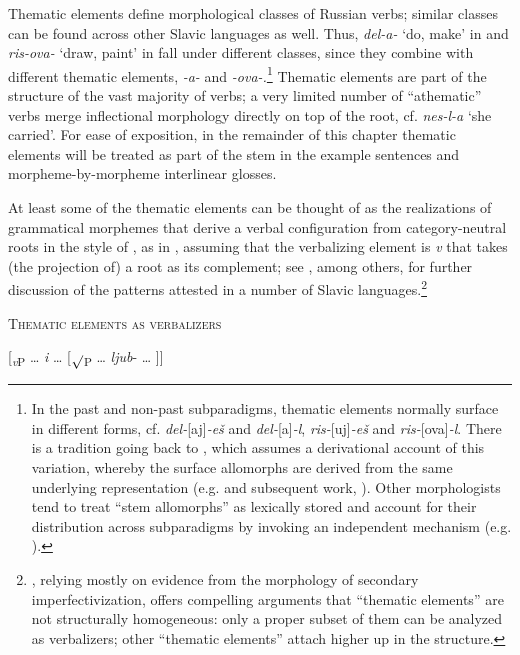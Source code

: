 \documentclass[output=paper,colorlinks,citecolor=brown]{langscibook}
\begin{document}
Thematic elements define morphological classes of Russian verbs; similar clas\-ses can be found across other Slavic languages as well. Thus, \textit{del-a-} ‘do, make’ in  and \textit{ris-ova-} ‘draw, paint’ in  fall under different classes, since they combine with different thematic elements, \textit{-a-} and \textit{-ova-.}\footnote{In the past and non-past subparadigms, thematic elements normally surface in different forms, cf. \textit{del-}[aj]\textit{-eš} and \textit{del-}[a]\textit{-l}, \textit{ris-}[uj]\textit{-eš} and \textit{ris-}[ova]\textit{-l}. There is a tradition going back to \citet{Jakobson1948}, which assumes a derivational account of this variation, whereby the surface allomorphs are derived from the same underlying representation (e.g. \citealt{Halle1963,Lightner1965} and subsequent work, \citealt{HalleMatushansky2004,Itkin2007}). Other morphologists tend to treat “stem allomorphs” as lexically stored and account for their distribution across subparadigms by invoking an independent mechanism (e.g. \citealt{Brown1998,Rubach.Booij2001}).} Thematic elements are part of the structure of the vast majority of verbs; a very limited number of “athematic” verbs merge inflectional morphology directly on top of the root, cf. \textit{nes-l-a} ‘she carried’. For %
ease of exposition, in the remainder of this chapter thematic elements will be treated as part of the stem in the example sentences and morpheme-by-morpheme interlinear glosses.

At least some of the thematic elements can be thought of as the realizations of grammatical morphemes that derive a verbal configuration from category-neutral roots in the style of \citet{Marantz1997}, as in , assuming that the verbalizing element is \textit{v} that takes (the projection of) a root as its complement; see \citet{Jablonska2007,Biskup2019,MismasSimonovic2021,Milosavljevic.Arsenijevic2022},  among others, for further discussion of the patterns attested in a number of Slavic languages.\footnote{\citet{Matushansky2009,Matushansky2021,Matushansky2024}, relying mostly on evidence from the morphology of secondary imperfectivization, offers compelling arguments that “thematic elements” are not structurally homogeneous: only a proper subset of them can be analyzed as verbalizers; other “thematic elements” attach higher up in the structure.}

\ea \textsc{Thematic elements as verbalizers}\label{tat:ex:3}

  [\textit{\textsubscript{v}}\textsubscript{P} … \textit{i} … [\textsubscript{${\surd}$P} … \textit{ljub}- … ]] 
\z
\end{document}
